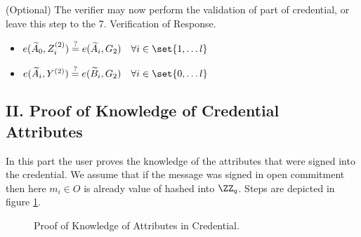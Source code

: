 (Optional) The verifier may now perform the validation of part of credential, or leave this step to the 7. Verification of Response.
\begin{itemize}[label=$\circ$]
    \item $e(\widetilde A_0, Z^{(2)}_i) \stackrel{?}{=} e(\widetilde A_i, G_2) \quad \forall i \in \set{1, \dots l} $
    \item $e(\widetilde A_i, Y^{(2)}) \stackrel{?}{=} e(\widetilde B_i, G_2) \quad \forall i \in \set{0, \dots l} $
\end{itemize}




\subsection*{II. Proof of Knowledge of Credential Attributes}
In this part the user proves the knowledge of the attributes that were signed into the credential. We assume that if the message was signed in \textsf{open} commitment then here $m_i \in O$ is already value of hashed into $\ZZ_q$. Steps are depicted in figure \ref{tech:verify-protocol-zkp}.

\begin{figure}[h]
\centering
{}
\caption{Proof of Knowledge of Attributes in Credential.}
\label{tech:verify-protocol-zkp}
\end{figure}

